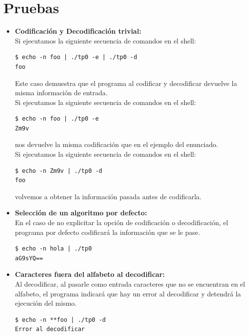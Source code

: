 \documentclass[a4paper,10pt, fleqn]{article}
\begin{document}
\section{Pruebas}
      \begin{itemize}
      \item \textbf{Codificación y Decodificación trivial: }\\
      Si ejecutamos la siguiente secuencia de comandos en el shell:\\
      \begin{verbatim}
$ echo -n foo | ./tp0 -e | ./tp0 -d
foo
      \end{verbatim}
      Este caso demuestra que el programa al codificar y decodificar devuelve la misma información de entrada.\\
      Si ejecutamos la siguiente secuencia de comandos en el shell:\\
      \begin{verbatim}
$ echo -n foo | ./tp0 -e
Zm9v	
      \end{verbatim}
      nos devuelve la misma codificación que en el ejemplo del enunciado. \\
      Si ejecutamos la siguiente secuencia de comandos en el shell:\\
      \begin{verbatim}
$ echo -n Zm9v | ./tp0 -d
foo	
      \end{verbatim}
      volvemos a obtener la información pasada antes de codificarla. \\
      
      \item \textbf{Selección de un algoritmo por defecto: }\\
      En el caso de no explicitar la opción de codificación o decodificación, el programa por defecto codificará la información que se le pase.\\
      \begin{verbatim}
$ echo -n hola | ./tp0
aG9sYQ==
      \end{verbatim}


      \item \textbf{Caracteres fuera del alfabeto al decodificar: }\\
      Al decodificar, al pasarle como entrada caracteres que no se encuentran en el alfabeto, el programa indicará que hay un error al decodificar y detendrá la ejecución del mismo.
      \begin{verbatim}
$ echo -n **foo | ./tp0 -d
Error al decodificar
      \end{verbatim}


\end{itemize}
\end{document}
